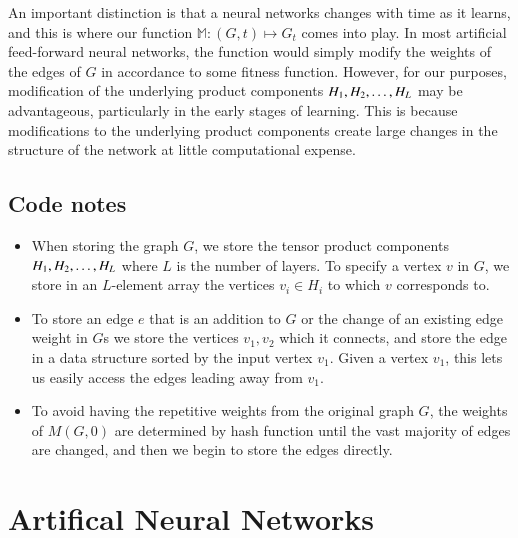\documentclass{article}
\newcommand{\M}{\mathbb{M}}
\begin{document}
An important distinction is that a neural networks changes with time as it learns, and this is where our function $\M : (G, t) \mapsto G_t$ comes into play. In most artificial feed-forward neural networks, the function would simply modify the weights of the edges of $G$ in accordance to some fitness function. However, for our purposes, modification of the underlying product components $H_1, H_2, \ldots, H_{L}$ may be advantageous, particularly in the early stages of learning. This is because modifications to the underlying product components create large changes in the structure of the network at little computational expense.

\subsection{Code notes} \label{code_outline}
\begin{itemize}
    \item When storing the graph $G$, we store the tensor product components $H_1, H_2, \ldots, H_{L}$ where $L$ is the number of layers. To specify a vertex $v$ in $G$, we store in an $L$-element array the vertices $v_i \in H_i$ to which $v$ corresponds to.

    \item To store an edge $e$ that is an addition to $G$ or the change of an existing edge weight in $G$s we store the vertices $v_1, v_2$ which it connects, and store the edge in a data structure sorted by the input vertex $v_1$. Given a vertex $v_1$, this lets us easily access the edges leading away from $v_1$.

    \item To avoid having the repetitive weights from the original graph $G$, the weights of $M(G,0)$ are determined by hash function until the vast majority of edges are changed, and then we begin to store the edges directly.

\end{itemize}


\section{Artifical Neural Networks}
\end{document}
